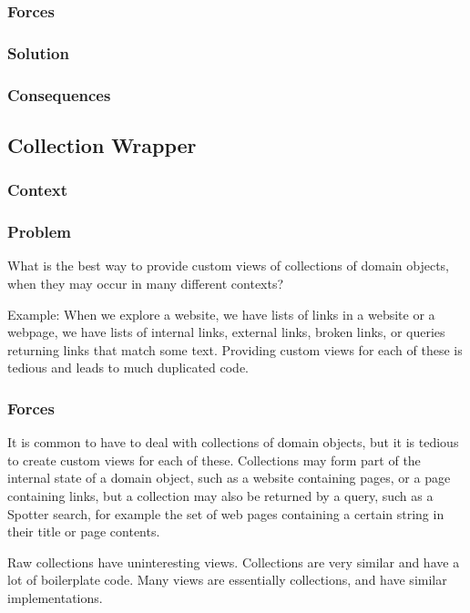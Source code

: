 \documentclass[sigconf]{acmart}
\begin{document}
\subsubsection*{Forces}
\subsubsection*{Solution}
\subsubsection*{Consequences}

\subsection*{Collection Wrapper}\label{pat:collectionWrapper}
\subsubsection*{Context}
\subsubsection*{Problem}

What is the best way to provide custom views of collections of domain objects, when they may occur in many different contexts?

Example:
When we explore a website, we have lists of links in a website or a webpage, we have lists of internal links, external links, broken links, or queries returning links that match some text. Providing custom views for each of these is tedious and leads to much duplicated code.

\subsubsection*{Forces}

It is common to have to deal with collections of domain objects, but it is tedious to create custom views for each of these. Collections may form part of the internal state of a domain object, such as a website containing pages, or a page containing links, but a collection may also be returned by a query, such as a Spotter search, for example the set of web pages containing a certain string in their title or page contents.

Raw collections have uninteresting views. Collections are very similar and have a lot of boilerplate code. Many views are essentially collections, and have similar implementations.
\end{document}
